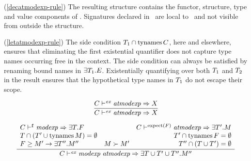 \comments \begin{description} 
  \item{(\ref{decatmodexp-rule})} The
    resulting structure contains the functor, structure, type and value
    components of \E. Signatures declared in
    \dec\ are local to \dec\ and not visible from outside the structure.

     
 
 \item{(\ref{letatmodexp-rule})} 
    The side condition $T_{1}\cap
    \mathop{\rm tynames}\nolimits C$, here and elsewhere, ensures that eliminating the
    first existential quantifier does not capture type names occurring
    free in the context. 
    The side condition  can always
    be satisfied by renaming bound names in $\exists{\ensuremath{T}_1}{.}{E}$.
    Existentially quantifying over both $T_{1}$
    and $T_{2}$ in the result ensures that the hypothetical type
    names in $T_{1}$ do not escape their scope.
\end{description}


\begin{equation}	%
\label{atmodexpmodexp}
\frac{\C\ts^\expect\atmodexp\ra\XM}
     {\C\ts^\expect\atmodexp\ra\XM}
\end{equation}

\begin{equation}		%
\label{appmodexp-rule}
\frac{\begin{array}{lcr}
      \C\ts^\expectfun\modexp\ra\exmod{\T}{\F} & &
      \C\ts^{\expectoffun{\F}}\atmodexp\ra\exmod{\T'}{\M} \\
       \T \cap (\T' \cup \TyNamesFcn \M) = \emptyset & &
       \T' \cap \TyNamesFcn \F = \emptyset \\
       \funinstantiates{\F}{\funinst{\M'}{\exmod{\T''}{\M''}}} &
       \M \succ \M' & \T'' \cap (\T \cup \T') = \emptyset \\
        \end{array}
      }
      {\C\ts^\expect\appmodexp\ra\exmod{\T\cup\T'\cup\T''}{\M''}}
\end{equation}


